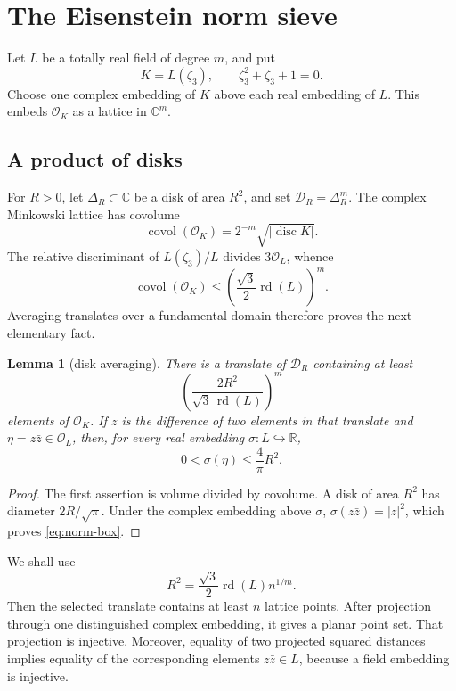 \documentclass[11pt]{article}
\newtheorem{lemma}[theorem]{Lemma}
\theoremstyle{definition}
\theoremstyle{remark}
\newcommand{\cO}{\mathcal O}
\newcommand{\R}{\mathbb R}
\newcommand{\C}{\mathbb C}
\newcommand{\rd}{\operatorname{rd}}
\begin{document}
\section{The Eisenstein norm sieve}

Let $L$ be a totally real field of degree $m$, and put
\[
 K=L(\zeta_3),\qquad \zeta_3^2+\zeta_3+1=0.
\]
Choose one complex embedding of $K$ above each real embedding of $L$.
This embeds $\cO_K$ as a lattice in $\C^m$.

\subsection{A product of disks}

For $R>0$, let $\Delta_R\subset\C$ be a disk of area $R^2$, and set
$\mathcal D_R=\Delta_R^m$.  The complex Minkowski lattice has covolume
\[
 \operatorname{covol}(\cO_K)=2^{-m}\sqrt{|\operatorname{disc}K|}.
\]
The relative discriminant of $L(\zeta_3)/L$ divides $3\cO_L$, whence
\[
 \operatorname{covol}(\cO_K)
 \le \left(\frac{\sqrt3}{2}\rd(L)\right)^m.       \tag{2.1}
\]
Averaging translates over a fundamental domain therefore proves the next
elementary fact.

\begin{lemma}[disk averaging]\label{lem:disk}
There is a translate of $\mathcal D_R$ containing at least
\[
 \left(\frac{2R^2}{\sqrt3\,\rd(L)}\right)^m
\]
elements of $\cO_K$.  If $z$ is the difference of two elements in that
translate and $\eta=z\bar z\in\cO_L$, then, for every real embedding
$\sigma:L\hookrightarrow\R$,
\[
 0<\sigma(\eta)\le \frac4\pi R^2.                \tag{2.2}\label{eq:norm-box}
\]
\end{lemma}

\begin{proof}
The first assertion is volume divided by covolume.  A disk of area $R^2$
has diameter $2R/\sqrt\pi$.  Under the complex embedding above $\sigma$,
$\sigma(z\bar z)=|z|^2$, which proves \eqref{eq:norm-box}.
\end{proof}

We shall use
\[
 R^2=\frac{\sqrt3}{2}\rd(L)n^{1/m}.              \tag{2.3}\label{eq:R-choice}
\]
Then the selected translate contains at least $n$ lattice points.  After
projection through one distinguished complex embedding, it gives a planar
point set.  That projection is injective.  Moreover, equality of two
projected squared distances implies equality of the corresponding elements
$z\bar z\in L$, because a field embedding is injective.
\end{document}
